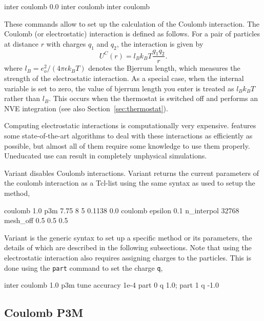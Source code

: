 \begin{essyntax}
   inter coulomb 0.0
   inter coulomb
   inter coulomb 
\end{essyntax}

These commands allow to set up the calculation of the Coulomb
interaction.  The Coulomb (or electrostatic) interaction is defined as
follows.  For a pair of particles at distance $r$ with charges $q_1$
and $q_2$, the interaction is given by
\begin{equation}
  U^C(r)=l_B k_B T\frac{q_1 q_2}{r}.
\end{equation}
where $l_B = e_o^2 / (4 \pi \epsilon k_B T)$ denotes the Bjerrum
length, which measures the strength of the electrostatic interaction.
As a special case, when the internal variable  
is set to zero, the value of bjerrum length you enter 
is treated as $l_B k_B T$ rather than $l_B$. This occurs when the
thermostat is switched off and \es performs an NVE integration
(see also Section~\ref{sec:thermostat}).

Computing electrostatic interactions is computationally very
expensive.  \es{} features some state-of-the-art algorithms to deal
with these interactions as efficiently as possible, but almost all of
them require some knowledge to use them properly.  Uneducated use can
result in completely unphysical simulations.

Variant  disables Coulomb interactions.  Variant
 returns the current parameters of the coulomb interaction
as a Tcl-list using the same syntax as used to setup the method, \eg
\begin{tclcode}
  {coulomb 1.0 p3m 7.75 8 5 0.1138 0.0}
  {coulomb epsilon 0.1 n_interpol 32768 mesh_off 0.5 0.5 0.5}
\end{tclcode}

Variant  is the generic syntax to set up a specific method
or its parameters, the details of which are described in the following
subsections.  Note that using the electrostatic interaction also
requires assigning charges to the particles.  This is done using the
\texttt{part} command to set the charge \texttt{q}, \eg
\begin{tclcode}
  inter coulomb 1.0 p3m tune accuracy 1e-4
  part 0 q 1.0; part 1 q -1.0
\end{tclcode}

\subsection{Coulomb P3M}
\label{sec:coulomb}

